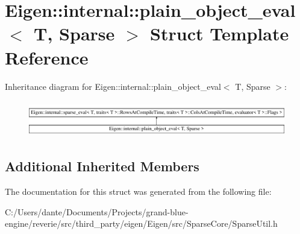 \hypertarget{struct_eigen_1_1internal_1_1plain__object__eval_3_01_t_00_01_sparse_01_4}{}\section{Eigen\+::internal\+::plain\+\_\+object\+\_\+eval$<$ T, Sparse $>$ Struct Template Reference}
\label{struct_eigen_1_1internal_1_1plain__object__eval_3_01_t_00_01_sparse_01_4}
Inheritance diagram for Eigen\+::internal\+::plain\+\_\+object\+\_\+eval$<$ T, Sparse $>$\+:\begin{figure}[H]
\begin{center}
\leavevmode
\includegraphics[height=1.593172cm]{struct_eigen_1_1internal_1_1plain__object__eval_3_01_t_00_01_sparse_01_4}
\end{center}
\end{figure}
\subsection*{Additional Inherited Members}


The documentation for this struct was generated from the following file\+:\begin{DoxyCompactItemize}
\item 
C\+:/\+Users/dante/\+Documents/\+Projects/grand-\/blue-\/engine/reverie/src/third\+\_\+party/eigen/\+Eigen/src/\+Sparse\+Core/Sparse\+Util.\+h\end{DoxyCompactItemize}
